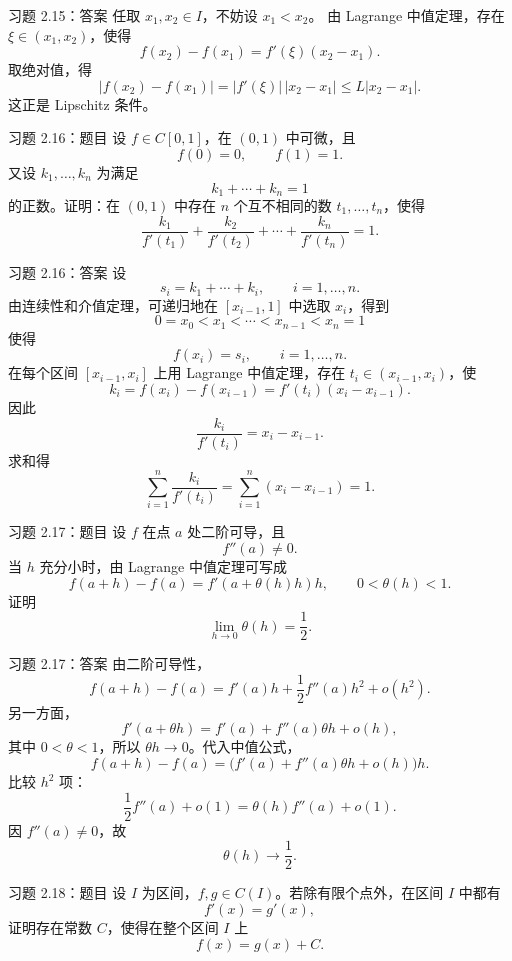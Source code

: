 \documentclass[aspectratio=169,10pt]{ctexbeamer}
\begin{document}
\begin{frame}{习题 2.15：答案}
\small
任取 $x_1,x_2\in I$，不妨设 $x_1<x_2$。
由 Lagrange 中值定理，存在 $\xi\in(x_1,x_2)$，使得
\[
  f(x_2)-f(x_1)=f'(\xi)(x_2-x_1).
\]
取绝对值，得
\[
  |f(x_2)-f(x_1)|
  =
  |f'(\xi)|\,|x_2-x_1|
  \le L|x_2-x_1|.
\]
这正是 Lipschitz 条件。
\end{frame}

\begin{frame}{习题 2.16：题目}
\small
设 $f\in C[0,1]$，在 $(0,1)$ 中可微，且
\[
  f(0)=0,\qquad f(1)=1.
\]
又设 $k_1,\ldots,k_n$ 为满足
\[
  k_1+\cdots+k_n=1
\]
的正数。证明：在 $(0,1)$ 中存在 $n$ 个互不相同的数
$t_1,\ldots,t_n$，使得
\[
  \frac{k_1}{f'(t_1)}+\frac{k_2}{f'(t_2)}+\cdots+\frac{k_n}{f'(t_n)}=1.
\]
\end{frame}

\begin{frame}{习题 2.16：答案}
\footnotesize
设
\[
  s_i=k_1+\cdots+k_i,\qquad i=1,\ldots,n.
\]
由连续性和介值定理，可递归地在 $[x_{i-1},1]$ 中选取 $x_i$，得到
\[
  0=x_0<x_1<\cdots<x_{n-1}<x_n=1
\]
使得
\[
  f(x_i)=s_i,\qquad i=1,\ldots,n.
\]
在每个区间 $[x_{i-1},x_i]$ 上用 Lagrange 中值定理，存在
$t_i\in(x_{i-1},x_i)$，使
\[
  k_i=f(x_i)-f(x_{i-1})=f'(t_i)(x_i-x_{i-1}).
\]
因此
\[
  \frac{k_i}{f'(t_i)}=x_i-x_{i-1}.
\]
求和得
\[
  \sum_{i=1}^n\frac{k_i}{f'(t_i)}
  =
  \sum_{i=1}^n(x_i-x_{i-1})=1.
\]
\end{frame}

\begin{frame}{习题 2.17：题目}
\small
设 $f$ 在点 $a$ 处二阶可导，且
\[
  f''(a)\ne0.
\]
当 $h$ 充分小时，由 Lagrange 中值定理可写成
\[
  f(a+h)-f(a)=f'(a+\theta(h)h)h,\qquad 0<\theta(h)<1.
\]
证明
\[
  \lim_{h\to0}\theta(h)=\frac12.
\]
\end{frame}

\begin{frame}{习题 2.17：答案}
\small
由二阶可导性，
\[
  f(a+h)-f(a)
  =
  f'(a)h+\frac12f''(a)h^2+o(h^2).
\]
另一方面，
\[
  f'(a+\theta h)
  =
  f'(a)+f''(a)\theta h+o(h),
\]
其中 $0<\theta<1$，所以 $\theta h\to0$。代入中值公式，
\[
  f(a+h)-f(a)=
  \bigl(f'(a)+f''(a)\theta h+o(h)\bigr)h.
\]
比较 $h^2$ 项：
\[
  \frac12f''(a)+o(1)=\theta(h)f''(a)+o(1).
\]
因 $f''(a)\ne0$，故
\[
  \theta(h)\to\frac12.
\]
\end{frame}

\begin{frame}{习题 2.18：题目}
\small
设 $I$ 为区间，$f,g\in C(I)$。若除有限个点外，在区间 $I$ 中都有
\[
  f'(x)=g'(x),
\]
证明存在常数 $C$，使得在整个区间 $I$ 上
\[
  f(x)=g(x)+C.
\]
\end{frame}
\end{document}

